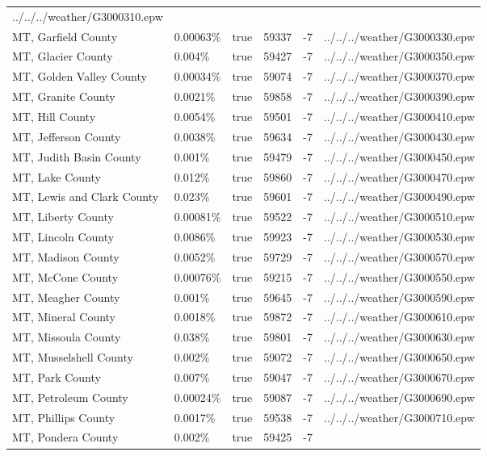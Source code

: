 \begin{longtable}[]{@{}llllll@{}}
../../../weather/G3000310.epw \\
MT, Garfield County & 0.00063\% & true & 59337 & -7 &
../../../weather/G3000330.epw \\
MT, Glacier County & 0.004\% & true & 59427 & -7 &
../../../weather/G3000350.epw \\
MT, Golden Valley County & 0.00034\% & true & 59074 & -7 &
../../../weather/G3000370.epw \\
MT, Granite County & 0.0021\% & true & 59858 & -7 &
../../../weather/G3000390.epw \\
MT, Hill County & 0.0054\% & true & 59501 & -7 &
../../../weather/G3000410.epw \\
MT, Jefferson County & 0.0038\% & true & 59634 & -7 &
../../../weather/G3000430.epw \\
MT, Judith Basin County & 0.001\% & true & 59479 & -7 &
../../../weather/G3000450.epw \\
MT, Lake County & 0.012\% & true & 59860 & -7 &
../../../weather/G3000470.epw \\
MT, Lewis and Clark County & 0.023\% & true & 59601 & -7 &
../../../weather/G3000490.epw \\
MT, Liberty County & 0.00081\% & true & 59522 & -7 &
../../../weather/G3000510.epw \\
MT, Lincoln County & 0.0086\% & true & 59923 & -7 &
../../../weather/G3000530.epw \\
MT, Madison County & 0.0052\% & true & 59729 & -7 &
../../../weather/G3000570.epw \\
MT, McCone County & 0.00076\% & true & 59215 & -7 &
../../../weather/G3000550.epw \\
MT, Meagher County & 0.001\% & true & 59645 & -7 &
../../../weather/G3000590.epw \\
MT, Mineral County & 0.0018\% & true & 59872 & -7 &
../../../weather/G3000610.epw \\
MT, Missoula County & 0.038\% & true & 59801 & -7 &
../../../weather/G3000630.epw \\
MT, Musselshell County & 0.002\% & true & 59072 & -7 &
../../../weather/G3000650.epw \\
MT, Park County & 0.007\% & true & 59047 & -7 &
../../../weather/G3000670.epw \\
MT, Petroleum County & 0.00024\% & true & 59087 & -7 &
../../../weather/G3000690.epw \\
MT, Phillips County & 0.0017\% & true & 59538 & -7 &
../../../weather/G3000710.epw \\
MT, Pondera County & 0.002\% & true & 59425 & -7 &

\end{longtable}

